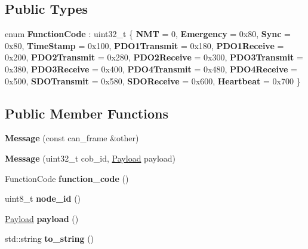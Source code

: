 \subsection*{Public Types}
\begin{DoxyCompactItemize}
\item 
\mbox{\label{class_c_a_nopen_1_1_message_a0f8f95e4ea1284011cd122629edc5468}} 
enum {\bfseries Function\+Code} \+: uint32\+\_\+t \{ \newline
{\bfseries N\+MT} = 0, 
{\bfseries Emergency} = 0x80, 
{\bfseries Sync} = 0x80, 
{\bfseries Time\+Stamp} = 0x100, 
\newline
{\bfseries P\+D\+O1\+Transmit} = 0x180, 
{\bfseries P\+D\+O1\+Receive} = 0x200, 
{\bfseries P\+D\+O2\+Transmit} = 0x280, 
{\bfseries P\+D\+O2\+Receive} = 0x300, 
\newline
{\bfseries P\+D\+O3\+Transmit} = 0x380, 
{\bfseries P\+D\+O3\+Receive} = 0x400, 
{\bfseries P\+D\+O4\+Transmit} = 0x480, 
{\bfseries P\+D\+O4\+Receive} = 0x500, 
\newline
{\bfseries S\+D\+O\+Transmit} = 0x580, 
{\bfseries S\+D\+O\+Receive} = 0x600, 
{\bfseries Heartbeat} = 0x700
 \}
\end{DoxyCompactItemize}
\subsection*{Public Member Functions}
\begin{DoxyCompactItemize}
\item 
\mbox{\label{class_c_a_nopen_1_1_message_a77a8c09ad0711fa4b574a8b88d983441}} 
{\bfseries Message} (const can\+\_\+frame \&other)
\item 
\mbox{\label{class_c_a_nopen_1_1_message_ace3b5218ab769fb1e642b82b2d3fc7d3}} 
{\bfseries Message} (uint32\+\_\+t cob\+\_\+id, \hyperlink{class_c_a_nopen_1_1_payload}{Payload} payload)
\item 
\mbox{\label{class_c_a_nopen_1_1_message_a83d9901bbd77dcca9b44d68fd1e604b8}} 
Function\+Code {\bfseries function\+\_\+code} ()
\item 
\mbox{\label{class_c_a_nopen_1_1_message_a845fe0c7682bd6eeef0a5dd87b5e3c63}} 
uint8\+\_\+t {\bfseries node\+\_\+id} ()
\item 
\mbox{\label{class_c_a_nopen_1_1_message_a65be4f77771803bed521cbbf2316271b}} 
\hyperlink{class_c_a_nopen_1_1_payload}{Payload} {\bfseries payload} ()
\item 
\mbox{\label{class_c_a_nopen_1_1_message_a0d3aade9268f612f1918d64e8c6057b7}} 
std\+::string {\bfseries to\+\_\+string} ()
\end{DoxyCompactItemize}


